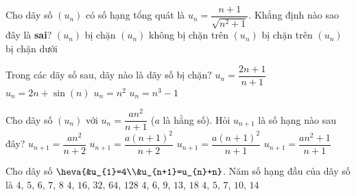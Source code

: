 \begin{ex}%
	Cho dãy số $(u_n)$ có số hạng tổng quát là 
	$u_n = \dfrac{n+1}{\sqrt{n^2 + 1}}$.  Khẳng định nào sao đây là \textbf{sai}?
	\choice 
		{$(u_n)$  bị chặn}
		{\True $(u_n)$ không bị chặn  trên}
		{$(u_n)$  bị chặn trên}
		{$(u_n)$ bị chặn dưới} 
\end{ex}

\begin{ex}%
	Trong các dãy số sau, dãy nào là dãy số bị  chặn?
	\choice 
		 {\True $u_n = \dfrac{2n+1}{n+1}$}
		{$u_n =  2n + \sin(n)$}
		 {$u_n = n^2$}
		{$u_n =  n^3-1$}
\end{ex}

\begin{ex}%
	Cho dãy số  $\left(u_{n} \right)$ với $u_{n} =\dfrac{an^{2} }{n+1} $ ($a$ là hằng số). Hỏi $u_{n+1}$ là số hạng nào sau đây?
	\choice 
		 {$u_{n+1} =\dfrac{an^{2} }{n+2} $}
		{\True $u_{n+1} =\dfrac{a\left(n+1\right)^{2} }{n+2} $} 
		{$u_{n+1} =\dfrac{a\left(n+1\right)^{2} }{n+1}  $}
		{$u_{n+1} =\dfrac{an^{2} +1}{n+1} $} 
\end{ex}

\begin{ex}%
	Cho dãy số  $\heva{&u_{1}=4\\&u_{n+1}=u_{n}+n}$. Năm số hạng đầu của dãy số là
	 \choice
		 {$4$, $5$, $6$, $7$, $8$}
		{$4$, $16$, $32$,  $64$, $128$}
		{$4$, $6$, $9$,  $13$, $18$}
		{\True $4$, $5$,  $7$, $10$, $14$}
\end{ex}

